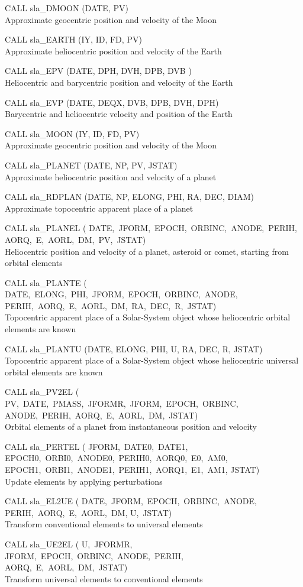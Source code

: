 \documentclass[11pt,twoside,nolof]{starlink}
\providecommand{\callhead}[1]{\goodbreak\vspace{\bigskipamount}{\large\bf{#1}}}
\newenvironment{callset}{\begin{list}{}{\setlength{\leftmargin}{2cm}
                             \setlength{\parsep}{\smallskipamount}}}{\end{list}}
\providecommand{\subp}[1]{\item\hspace{-1cm}#1\\}
\begin{document}
\callhead{Ephemerides}
\begin{callset}
\subp{CALL sla\_DMOON (DATE, PV)}
   Approximate geocentric position and velocity of the Moon
\subp{CALL sla\_EARTH (IY, ID, FD, PV)}
   Approximate heliocentric position and velocity of the Earth
\subp{CALL sla\_EPV (DATE, DPH, DVH, DPB, DVB )}
   Heliocentric and barycentric position and velocity of the Earth
\subp{CALL sla\_EVP (DATE, DEQX, DVB, DPB, DVH, DPH)}
   Barycentric and heliocentric velocity and position of the Earth
\subp{CALL sla\_MOON (IY, ID, FD, PV)}
   Approximate geocentric position and velocity of the Moon
\subp{CALL sla\_PLANET (DATE, NP, PV, JSTAT)}
   Approximate heliocentric position and velocity of a planet
\subp{CALL sla\_RDPLAN (DATE, NP, ELONG, PHI, RA, DEC, DIAM)}
   Approximate topocentric apparent place of a planet
\subp{CALL sla\_PLANEL (\vtop
                       {\hbox{DATE, JFORM, EPOCH, ORBINC, ANODE, PERIH,}
                      \hbox{AORQ, E, AORL, DM, PV, JSTAT)}}}
   Heliocentric position and velocity of a planet, asteroid or
   comet, starting from orbital elements
\subp{CALL sla\_PLANTE (\vtop
                       {\hbox{DATE, ELONG, PHI, JFORM, EPOCH, ORBINC, ANODE,}
                      \hbox{PERIH, AORQ, E, AORL, DM, RA, DEC, R, JSTAT)}}}
   Topocentric apparent place of a Solar-System object whose
   heliocentric orbital elements are known
\subp{CALL sla\_PLANTU (DATE, ELONG, PHI, U, RA, DEC, R, JSTAT)}
   Topocentric apparent place of a Solar-System object whose
   heliocentric universal orbital elements are known
\subp{CALL sla\_PV2EL (\vtop
                      {\hbox{PV, DATE, PMASS, JFORMR, JFORM, EPOCH, ORBINC,}
                     \hbox{ANODE, PERIH, AORQ, E, AORL, DM, JSTAT)}}}
   Orbital elements of a planet from instantaneous position and velocity
\subp{CALL sla\_PERTEL (\vtop
                       {\hbox{JFORM, DATE0, DATE1,}
                     \hbox{EPOCH0, ORBI0, ANODE0, PERIH0, AORQ0, E0, AM0,}
                     \hbox{EPOCH1, ORBI1, ANODE1, PERIH1, AORQ1, E1, AM1,}
                     \hbox{JSTAT)}}}
   Update elements by applying perturbations
\subp{CALL sla\_EL2UE (\vtop
                      {\hbox{DATE, JFORM, EPOCH, ORBINC, ANODE,}
                     \hbox{PERIH, AORQ, E, AORL, DM,}
                     \hbox{U, JSTAT)}}}
   Transform conventional elements to universal elements
\subp{CALL sla\_UE2EL (\vtop
                      {\hbox{U, JFORMR,}
                     \hbox{JFORM, EPOCH, ORBINC, ANODE, PERIH,}
                     \hbox{AORQ, E, AORL, DM, JSTAT)}}}
   Transform universal elements to conventional elements

\end{callset}
\end{document}
